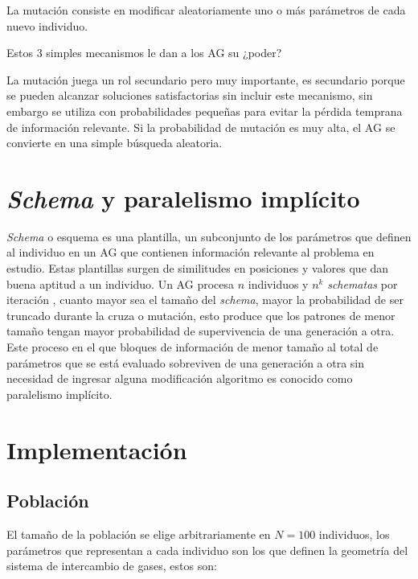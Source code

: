 La mutación consiste en modificar aleatoriamente uno o más parámetros de cada
nuevo individuo.

Estos 3 simples mecanismos le dan a los AG su ¿poder?

La mutación juega un rol secundario pero muy importante, es secundario porque
se pueden alcanzar soluciones satisfactorias sin incluir este mecanismo, sin
embargo se utiliza con probabilidades pequeñas para evitar la pérdida temprana
de información relevante.
%
Si la probabilidad de mutación es muy alta, el AG se convierte en una simple
búsqueda aleatoria.

\section{\emph{Schema} y paralelismo implícito}

\emph{Schema} o esquema es una plantilla, un subconjunto de los parámetros que
definen al individuo en un AG que contienen información relevante al problema
en estudio.
%
Estas plantillas surgen de similitudes en posiciones y valores que dan buena
aptitud a un individuo.
%
Un AG procesa $n$ individuos y $n^k$ \emph{schematas} por iteración
\cite{goldberg}, cuanto mayor sea el tamaño del \emph{schema}, mayor la
probabilidad de ser truncado durante la cruza o mutación, esto produce que los
patrones de menor tamaño tengan mayor probabilidad de supervivencia de una
generación a otra.
%
Este proceso en el que bloques de información de menor tamaño al total de
parámetros que se está evaluado sobreviven de una generación a otra sin
necesidad de ingresar alguna modificación algoritmo es conocido como paralelismo
implícito.

\section{Implementación}
%
\subsection{Población}
%
El tamaño de la población se elige arbitrariamente en $N=100$ individuos, los
parámetros que representan a cada individuo son los que definen la geometría
del sistema de intercambio de gases, estos son:


